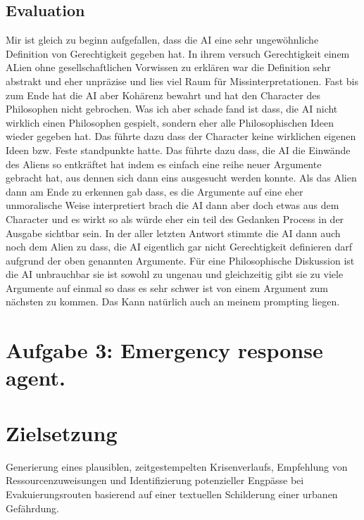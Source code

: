 \documentclass[a4paper,12pt]{scrartcl}
\begin{document}
\subsection*{Evaluation}
Mir ist gleich zu beginn aufgefallen, dass die AI eine sehr ungewöhnliche Definition von Gerechtigkeit gegeben hat. In ihrem versuch Gerechtigkeit einem ALien ohne gesellschaftlichen Vorwissen zu erklären war die Definition sehr abstrakt und eher unpräzise und lies viel Raum für Missinterpretationen. Fast bis zum Ende hat die AI aber Kohärenz bewahrt und hat den Character des Philosophen nicht gebrochen. Was ich aber schade fand ist dass, die AI nicht wirklich einen Philosophen gespielt, sondern eher alle Philosophischen Ideen wieder gegeben hat. Das führte dazu dass der Character keine wirklichen eigenen Ideen bzw. Feste standpunkte hatte. Das führte dazu dass, die AI die Einwände des Aliens so entkräftet hat indem es einfach eine reihe neuer Argumente gebracht hat, aus dennen sich dann eins ausgesucht werden konnte. Als das Alien dann am Ende zu erkennen gab dass, es die Argumente auf eine eher unmoralische Weise interpretiert brach die AI dann aber doch etwas aus dem Character und es wirkt so als würde eher ein teil des Gedanken Process in der Ausgabe sichtbar sein. In der aller letzten Antwort stimmte die AI dann auch noch dem Alien zu dass, die AI eigentlich gar nicht Gerechtigkeit definieren darf aufgrund der oben genannten Argumente. Für eine Philosophische Diskussion ist die AI unbrauchbar sie ist sowohl zu ungenau und gleichzeitig gibt sie zu viele Argumente auf einmal so dass es sehr schwer ist von einem Argument zum nächsten zu kommen. Das Kann natürlich auch an meinem prompting liegen.

\section*{Aufgabe 3: Emergency response agent.}
\section{Zielsetzung}
\noindent
Generierung eines plausiblen, zeitgestempelten Krisenverlaufs, Empfehlung von Ressourcenzuweisungen und Identifizierung potenzieller Engpässe bei Evakuierungsrouten basierend auf einer textuellen Schilderung einer urbanen Gefährdung.
\end{document}
